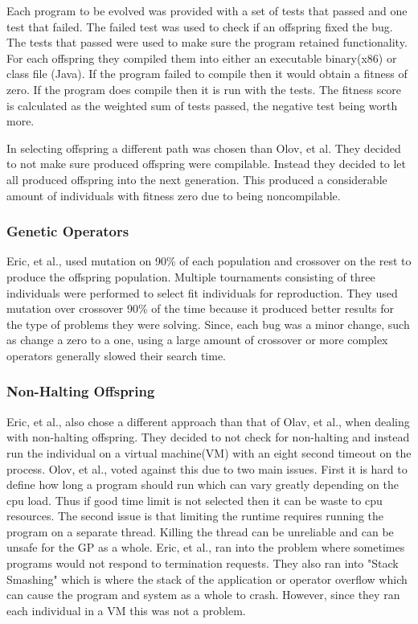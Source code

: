 \documentclass{sig-alternate}
\begin{document}
Each program to be evolved was provided with a set of tests that passed and one test that failed. The failed test was used to check if an offspring fixed the bug. The tests that passed were used to make sure the program retained functionality. For each offspring they compiled them into either an executable binary(x86) or class file (Java). If the program failed to compile then it would obtain a fitness of zero. If the program does compile then it is run with the tests. The fitness score is calculated as the weighted sum of tests passed, the negative test being worth more.

In selecting offspring a different path was chosen than Olov, et al. They decided to not make sure produced offspring were compilable. Instead they decided to let all produced offspring into the next generation. This produced a considerable amount of individuals with fitness zero due to being noncompilable.   

\subsubsection{Genetic Operators}
Eric, et al., used mutation on 90\% of each population and crossover on the rest to produce the offspring population. Multiple tournaments consisting of three individuals were performed to select fit individuals for reproduction. They used mutation over crossover 90\% of the time because it produced better results for the type of problems they were solving. Since, each bug was a minor change, such as change a zero to a one, using a large amount of crossover or more complex operators generally slowed their search time.  

\subsubsection{Non-Halting Offspring}

Eric, et al., also chose a different approach than that of Olav, et al., when dealing with non-halting offspring. They decided to not check for non-halting and instead run the individual on a virtual machine(VM) with an eight second timeout on the process. Olov, et al., voted against this due to two main issues. First it is hard to define how long a program should run which can vary greatly depending on the cpu load. Thus if good time limit is not selected then it can be waste to cpu resources. The second issue is that limiting the runtime requires running the program on a separate thread. Killing the thread can be unreliable and can be unsafe for the GP as a whole. Eric, et al., ran into the problem where sometimes programs would not respond to termination requests.
They also ran into "Stack Smashing" which is where the stack of the application or operator overflow which can cause the program and system as a whole to crash. However, since they ran each individual in a VM this was not a problem.  
\end{document}
